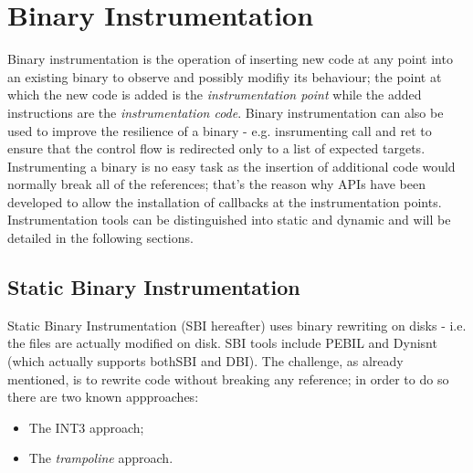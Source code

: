 \chapter{Binary Instrumentation}
Binary instrumentation is the operation of inserting new code at any point into an existing binary to observe and
possibly modifiy its behaviour; the point at which the new code is added is the \textit{instrumentation point} while the
added instructions are the \textit{instrumentation code}. Binary instrumentation can also be used to improve the
resilience of a binary - e.g. insrumenting {\ttfamily call} and {\ttfamily ret} to ensure that the control flow is
redirected only to a list of expected targets. Instrumenting a binary is no easy task as the insertion of additional
code would normally break all of the references; that's the reason why APIs have been developed to allow the
installation of callbacks at the instrumentation points. Instrumentation tools can be distinguished into static and
dynamic and will be detailed in the following sections.



\section{Static Binary Instrumentation}
Static Binary Instrumentation (SBI hereafter) uses binary rewriting on disks - i.e. the files are actually modified on
disk. SBI tools include PEBIL and Dynisnt (which actually supports bothSBI and DBI). The challenge, as already
mentioned, is to rewrite code without breaking any reference; in order to do so there are two known appproaches:
\begin{itemize}
    \item The {\ttfamily INT3} approach;
    \item The \textit{trampoline} approach.
\end{itemize}


